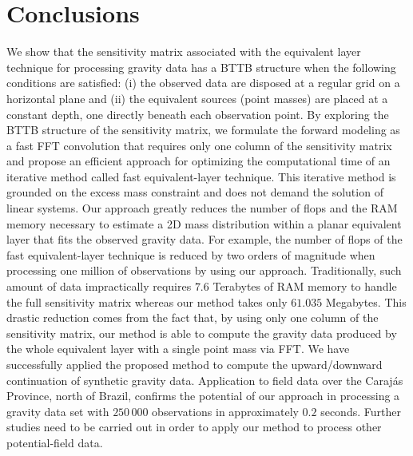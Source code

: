 \section{Conclusions}

We show that the sensitivity matrix associated with the equivalent layer technique 
for processing gravity data has a BTTB structure when the following conditions are
satisfied: (i) the observed data are disposed at a regular grid on a horizontal plane
and (ii) the equivalent sources (point masses) are placed at a constant depth, one directly 
beneath each observation point.
By exploring the BTTB structure of the sensitivity matrix, we formulate the forward modeling as a 
fast FFT convolution that requires only one column of the sensitivity matrix 
and propose an efficient approach for optimizing the computational time of an 
iterative method called fast equivalent-layer technique.
This iterative method is grounded on the excess mass constraint and does not demand the solution of 
linear systems.
Our approach greatly reduces the number of flops and the RAM memory necessary to estimate a 
2D mass distribution within a planar equivalent layer that fits the observed gravity data. 
For example, the number of flops of the fast equivalent-layer technique is reduced by two orders 
of magnitude when processing one million of observations by using our approach. 
Traditionally, such amount of data impractically requires $7.6$ Terabytes of RAM memory to handle 
the full sensitivity matrix whereas our method takes only $61.035$ Megabytes.
This drastic reduction comes from the fact that, by using only one column of the sensitivity matrix,
our method is able to compute the gravity data produced by the whole equivalent layer with a single 
point mass via FFT.
We have successfully applied the proposed method to compute the upward/downward continuation of 
synthetic gravity data. Application to field data over the Caraj{\'a}s Province, north of Brazil, 
confirms the potential of our approach in processing a gravity data set with $250\,000$ observations 
in approximately $0.2$ seconds. Further studies need to be carried out in order to apply our 
method to process other potential-field data.